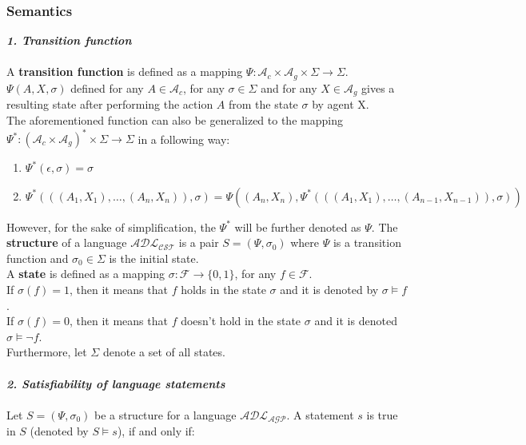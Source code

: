 \documentclass[a4paper]{article}
\begin{document}
\subsubsection{Semantics}
%
\textbf{\textit{1. Transition function}}
\\ \\
A \textbf{transition function} is defined as a mapping $\Psi\colon\mathcal{A}_c\times\mathcal{A}_g\times\Sigma\rightarrow\Sigma$. \\
$\Psi(A,X,\sigma)$ defined for any $A\in\mathcal{A}_c$, for any $\sigma\in\Sigma$ and for any $X\in\mathcal{A}_g$ gives a resulting state after performing the action $A$ from the state $\sigma$ by agent X. \\[0.5\baselineskip]
The aforementioned function can also be generalized to the mapping $\Psi^\ast\colon(\mathcal{A}_c \times \mathcal{A}_g)^\ast\times\Sigma\rightarrow\Sigma$ in a following way:
\begin{enumerate}
    \item $\Psi^\ast(\epsilon,\sigma)=\sigma$
    \item $\Psi^\ast(((A_1,X_1),\dotsc,(A_n,X_n)),\sigma)=\Psi((A_n,X_n),\Psi^\ast(((A_1,X_1),\dotsc,(A_{n-1},X_{n-1})),\sigma))$
\end{enumerate}
However, for the sake of simplification, the $\Psi^\ast$ will be further denoted as $\Psi$.
The \textbf{structure} of a language $\mathcal{ADL_{CST}}$ is a pair $S=(\Psi,\sigma_0)$ where $\Psi$ is a transition function and $\sigma_0\in\Sigma$ is the initial state. \\[0.5\baselineskip]
A \textbf{state} is defined as a mapping $\sigma\colon\mathcal{F}\rightarrow\{0, 1\}$, for any $f\in\mathcal{F}$. \\
If $\sigma(f)=1$, then it means that $f$ holds in the state $\sigma$ and it is denoted by $\sigma\models f$. \\
If $\sigma(f)=0$, then it means that $f$ doesn't hold in the state $\sigma$ and it is denoted $\sigma\models\neg f$. \\
Furthermore, let $\Sigma$ denote a set of all states. 
\\ \\
\textbf{\textit{2. Satisfiability of language statements}}
\\ \\
Let $S=(\Psi, \sigma_0)$ be a structure for a language $\mathcal{ADL_{AGP}}$. A statement $s$ is true in $S$ (denoted by $S\models s$), if and only if:
\end{document}
